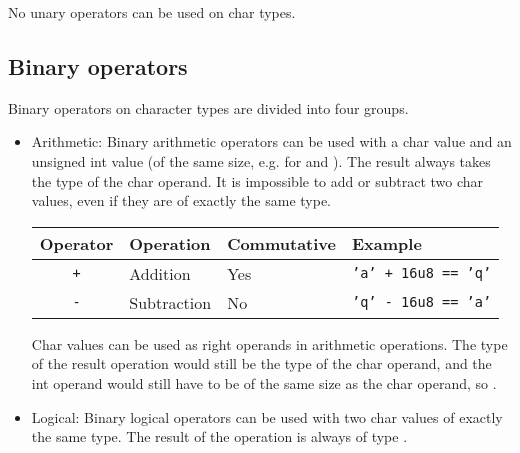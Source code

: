 No unary operators can be used on char types.

\subsection{Binary operators}
\label{sec:orge863f7d}

Binary operators on character types are divided into four groups.

\begin{itemize}
  \setlength\itemsep{-4pt}
\item Arithmetic: Binary arithmetic operators can be used with a char value and
  an unsigned int value (of the same size, e.g. for  and
  ). The result always takes the type of the char operand. It is
  impossible to add or subtract two char values, even if they are of exactly the
  same type.

  \begin{center}
    \begin{adjustbox}{max width=1.0\linewidth}
      \begin{tabular}{|c|lll|}
        \hline
        Operator & Operation & Commutative & Example\\[0pt]
        \hline
        \hline
        \texttt{+} & Addition & Yes & \texttt{'a' + 16u8 == 'q'}\\[0pt]
        \texttt{-} & Subtraction & No & \texttt{'q' - 16u8 == 'a'}\\[0pt]
        \hline
      \end{tabular}
  \end{adjustbox}\end{center}


  Char values can be used as right operands in arithmetic operations. The type of
  the result operation would still be the type of the char operand, and the int
  operand would still have to be of the same size as the char operand, so
  .

\item Logical: Binary logical operators can be used with two char values of
  exactly the same type. The result of the operation is always of type
  .


\end{itemize}
